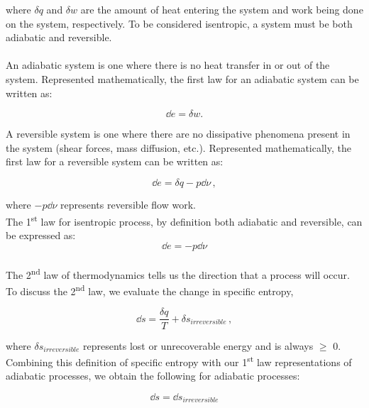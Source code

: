 \documentclass[12pt,letterpaper]{article}
\begin{document}
\begin{enumerate}[label=(\alph*)]
\begin{enumerate}[label=\arabic*.]
					where $\delta q$ and $\delta w$ are the amount of heat entering the system and work being done on the system, respectively. To be considered isentropic, a system must be both adiabatic and reversible.\\
					\medskip
					\\
					An adiabatic system is one where there is no heat transfer in or out of the system. Represented mathematically, the first law for an adiabatic system can be written as:

					\begin{equation*}
						\dd e = \delta w.
					\end{equation*}
					
					A reversible system is one where there are no dissipative phenomena present in the system (shear forces, mass diffusion, etc.). Represented mathematically, the first law for a reversible system can be written as:
					
					\begin{equation*}
						\dd e = \delta q - p\dd \nu\,,
					\end{equation*}			
						
					where $-p\dd \nu$ represents reversible flow work. \\
					
					The 1\textsuperscript{st} law for isentropic process, by definition both adiabatic and reversible, can be expressed as:
					\begin{equation*}
						\dd e = -p\dd \nu
					\end{equation*}
					\medskip
					\\
					
					The 2\textsuperscript{nd} law of thermodynamics tells us the direction that a process will occur. To discuss the 2\textsuperscript{nd} law, we evaluate the change in specific entropy,
					
					\begin{equation*}
						\dd s = \frac{\delta q}{T} + \delta s_{irreversible}\,,
					\end{equation*}
				
					
					where $\delta s_{irreversible}$ represents lost or unrecoverable energy and is always $\ge$ 0. Combining this definition of specific entropy with our 1\textsuperscript{st} law representations of adiabatic processes, we obtain the following for adiabatic processes:
					
					\begin{equation*}
						\dd s = \dd s_{irreversible}
					\end{equation*}
					

\end{enumerate}
\end{enumerate}
\end{document}
